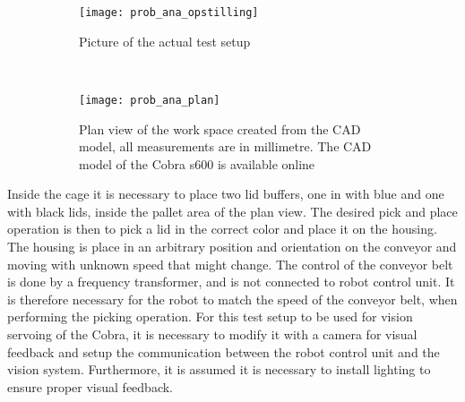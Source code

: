 \begin{figure}[htbp]
\centering
\begin{subfigure}[t]{0.45\textwidth}
\centering
\texttt{[image: prob\_ana\_opstilling]}
\caption{Picture of the actual test setup}
\label{fig_pic_setup}


\end{subfigure}~~
\begin{subfigure}[t]{0.45\textwidth}
\centering
\texttt{[image: prob\_ana\_plan]}
\caption{Plan view of the work space created from the CAD model, all measurements are in millimetre. The CAD model of the Cobra s600 is available online \citep{cobra}}
\label{fig_sketch_plan}

\end{subfigure}
\caption{}
\end{figure} 
\noindent Inside the cage it is necessary to place two lid buffers, one in with blue and one with black lids, inside the pallet area of the plan view. The desired pick and place operation is then to pick a lid in the correct color and place it on the housing. The housing is place in an arbitrary position and orientation on the conveyor and moving with unknown speed that might change. The control of the conveyor belt is done by a frequency transformer, and is not connected to robot control unit. It is therefore necessary for the robot to match the speed of the conveyor belt, when performing the picking operation. For this test setup to be used for vision servoing of the Cobra, it is necessary to modify it with a camera for visual feedback and setup the communication between the robot control unit and the vision system. Furthermore, it is assumed it is necessary to install lighting to ensure proper visual feedback.
